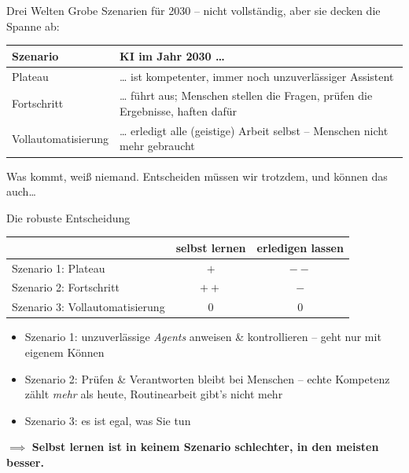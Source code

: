 \documentclass[
  10pt,
  ignorenonframetext,
]{beamer}
\providecommand{\tightlist}{%
  \setlength{\itemsep}{0pt}\setlength{\parskip}{0pt}}
\begin{document}
\begin{frame}{Drei Welten}
\protect\hypertarget{drei-welten}{}
Grobe Szenarien für 2030 -- nicht vollständig, aber sie decken die
Spanne ab:

\begin{center}
\renewcommand{\arraystretch}{1.4}
\begin{tabular}{@{}>{\raggedright\arraybackslash}p{3.2cm}>{\raggedright\arraybackslash}p{7.6cm}@{}}
\toprule
\textbf{Szenario} & \textbf{KI im Jahr 2030 \ldots} \\
\midrule
Plateau & \ldots{} ist kompetenter, immer noch unzuverlässiger Assistent \\
Fortschritt & \ldots{} führt aus; Menschen stellen die Fragen, prüfen die Ergebnisse, haften dafür \\
Vollautomatisierung & \ldots{} erledigt alle (geistige) Arbeit selbst -- Menschen nicht mehr gebraucht \\
\bottomrule
\end{tabular}
\end{center}

Was kommt, weiß niemand. Entscheiden müssen wir trotzdem, und können das
auch\ldots{}
\end{frame}

\begin{frame}{Die robuste Entscheidung}
\protect\hypertarget{die-robuste-entscheidung}{}
\begin{center}
\renewcommand{\arraystretch}{1.4}
\begin{tabular}{@{}lcc@{}}
\toprule
 & \textbf{selbst lernen} & \textbf{erledigen lassen} \\
\midrule
Szenario 1: Plateau & $+$ & $--$ \\
Szenario 2: Fortschritt & $++$ & $-$ \\
Szenario 3: Vollautomatisierung & $0$ & $0$ \\
\bottomrule
\end{tabular}
\end{center}

\begin{itemize}
\tightlist
\item
  Szenario 1: unzuverlässige \emph{Agents} anweisen \& kontrollieren --
  geht nur mit eigenem Können
\item
  Szenario 2: Prüfen \& Verantworten bleibt bei Menschen -- echte
  Kompetenz zählt \emph{mehr} als heute, Routinearbeit gibt's nicht mehr
\item
  Szenario 3: es ist egal, was Sie tun
\end{itemize}

\(\implies\) \textbf{Selbst lernen ist in keinem Szenario schlechter, in
den meisten besser.}
\end{frame}
\end{document}
